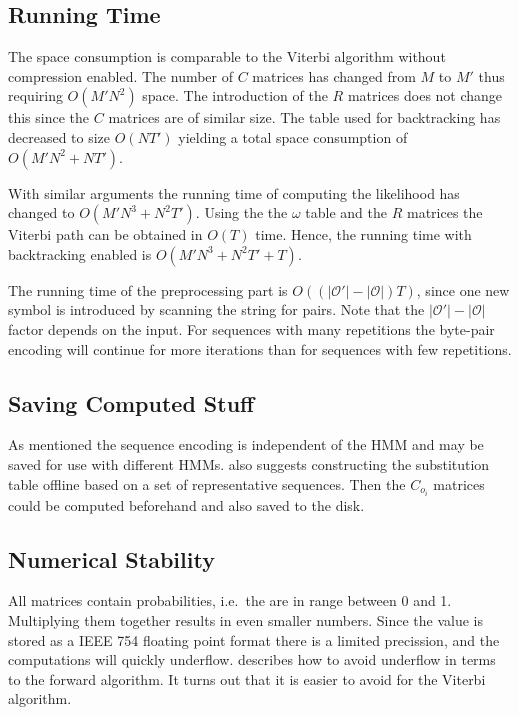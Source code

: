 \subsection{Running Time}
\label{sec:running-time}

The space consumption is comparable to the Viterbi algorithm without
compression enabled. The number of $C$ matrices has changed from $M$ to $M'$
thus requiring $O(M' N^2)$ space. The introduction of the $R$ matrices does not
change this since the $C$ matrices are of similar size. The table used for
backtracking has decreased to size $O(N T')$ yielding a total space consumption
of $O(M' N^2 + N T')$.

With similar arguments the running time of computing the likelihood has changed
to $O(M' N^3 +N^2 T')$. Using the the $\omega$ table and the $R$ matrices the
Viterbi path can be obtained in $O(T)$ time. Hence, the running time with
backtracking enabled is $O(M' N^3 +N^2 T' + T)$.

The running time of the preprocessing part is $O(
\left(
  \lvert\mathcal{O'}\rvert - \lvert{\mathcal{O}}\rvert
\right) T)$, since one new symbol is introduced by scanning the string for
pairs. Note that the $\lvert\mathcal{O'}\rvert - \lvert{\mathcal{O}}\rvert$
factor depends on the input. For sequences with many repetitions the byte-pair
encoding will continue for more iterations than for sequences with few
repetitions.

\subsection{Saving Computed Stuff}
\label{sec:saving-comp-stuff}

As mentioned the sequence encoding is independent of the HMM and may be saved
for use with different HMMs. \citet{lifshits2009speeding} also suggests
constructing the substitution table offline based on a set of representative
sequences. Then the $C_{o_i}$ matrices could be computed beforehand and also
saved to the disk.

\subsection{Numerical Stability}

All matrices contain probabilities, i.e.\ the are in range between 0 and
1. Multiplying them together results in even smaller numbers. Since the value
is stored as a IEEE 754 floating point format there is a limited precission,
and the computations will quickly underflow. \citet{sand2013ziphmmlib}
describes how to avoid underflow in terms to the forward algorithm. It turns
out that it is easier to avoid for the Viterbi algorithm.

